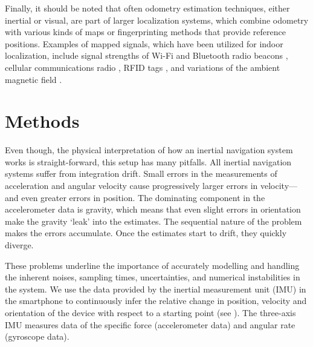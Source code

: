 \documentclass[conference]{ieeetran}
\begin{document}
Finally, it should be noted that often odometry estimation techniques, either inertial or visual, are part of larger localization systems, which combine odometry with various kinds of maps or fingerprinting methods that provide reference positions. Examples of mapped signals, which have been utilized for indoor localization, include signal strengths of Wi-Fi and Bluetooth radio beacons \cite{Mirowski+Ho+Yi+MacDonald:2013}, cellular communications radio \cite{Martin+Vinyals+Friedland+Bajcsy:2010}, RFID tags \cite{Ruiz+Granja+Honorato+Rosas:2012}, and variations of the ambient magnetic field \cite{Solin+Kok+Wahlstrom+Schon+Sarkka:2015,Solin+Sarkka+Kannala+Rahtu:2016}.
  


\section{Methods}
\label{sec:methods}

\noindent






Even though, the physical interpretation of how an inertial navigation system works is straight-forward, this setup has many pitfalls. All inertial navigation systems suffer from integration drift. Small errors in the measurements of acceleration and angular velocity cause progressively larger errors in velocity---and even greater errors in position. The dominating component in the accelerometer data is gravity, which means that even slight errors in orientation make the gravity `leak' into the estimates. The sequential nature of the problem makes the errors accumulate. Once the estimates start to drift, they quickly diverge.

These problems underline the importance of accurately modelling and handling the inherent noises, sampling times, uncertainties, and numerical instabilities in the system. We use the data provided by the inertial measurement unit (IMU) in the smartphone to continuously infer the relative change in position, velocity and orientation of the device with respect to a starting point (see \cite{Jekeli:2001,Britting:2010}). The three-axis IMU measures data of the specific force (accelerometer data) and angular rate (gyroscope data).
\end{document}
